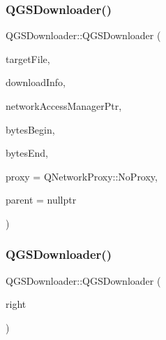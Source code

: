 \subsubsection{\texorpdfstring{Q\+G\+S\+Downloader()}{QGSDownloader()}\hspace{0.1cm}{\footnotesize\ttfamily [1/3]}}
{\footnotesize\ttfamily Q\+G\+S\+Downloader\+::\+Q\+G\+S\+Downloader (\begin{DoxyParamCaption}\item[{Q\+File $\ast$}]{target\+File,  }\item[{const \mbox{\hyperlink{class_q_g_s_download_info}{Q\+G\+S\+Download\+Info}} \&}]{download\+Info,  }\item[{\mbox{\hyperlink{class_q_g_s_network_access_manager}{Q\+G\+S\+Network\+Access\+Manager}} $\ast$}]{network\+Access\+Manager\+Ptr,  }\item[{qint64}]{bytes\+Begin,  }\item[{qint64}]{bytes\+End,  }\item[{const Q\+Network\+Proxy \&}]{proxy = {\ttfamily QNetworkProxy\+:\+:NoProxy},  }\item[{Q\+Object $\ast$}]{parent = {\ttfamily nullptr} }\end{DoxyParamCaption})}

\mbox{\label{class_q_g_s_downloader_a85de50f01c9a7ac238f1799848caff3c}} 
\subsubsection{\texorpdfstring{Q\+G\+S\+Downloader()}{QGSDownloader()}\hspace{0.1cm}{\footnotesize\ttfamily [2/3]}}
{\footnotesize\ttfamily Q\+G\+S\+Downloader\+::\+Q\+G\+S\+Downloader (\begin{DoxyParamCaption}\item[{const \mbox{\hyperlink{class_q_g_s_downloader}{Q\+G\+S\+Downloader}} \&}]{right }\end{DoxyParamCaption})\hspace{0.3cm}{\ttfamily [delete]}}

\mbox{\label{class_q_g_s_downloader_aa5d78f482e5a7fb04e18d447ba22c887}} 
